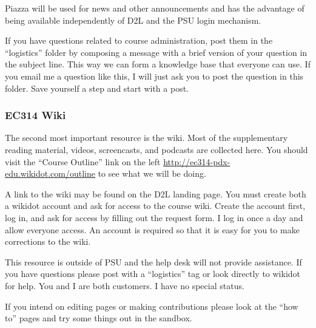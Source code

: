 \documentclass[letterpaper,10pt]{article}
\begin{document}
Piazza will be used for news and other announcements and has the advantage of being available independently of D2L and the PSU login mechanism.  

If you have questions related to course administration, post them in
the ``logistics'' folder by composing a message with a brief version of your question in the subject line. This way we can form a knowledge base that everyone can use.  If you email me a question like this, I will just ask you to post the question in this folder.  Save yourself a step and start with a post.



\subsubsection{EC314 Wiki}
The second most important resource is the wiki.  Most of the
supplementary reading material, videos, screencasts, and podcasts are
collected here. You should visit the ``Course Outline'' link on the
left \url{http://ec314-pdx-edu.wikidot.com/outline} to see what we will be
doing.

A link to the wiki may be found on the D2L landing page.  You must create both a wikidot account and ask for access to the course wiki.  Create the account first, log in, and ask for access by filling out the request form.  I log in once a day and allow everyone access.  An account is required so that it is easy for you to make corrections to the wiki.

This resource is outside of PSU and the help desk will not provide
assistance.  If you have questions please post with a  
``logistics'' tag or look directly to wikidot
for help.  You and I are both customers. I have no special status.

If you intend on editing pages or making contributions please look at
the ``how to'' pages and try some things out in the sandbox.
\end{document}
